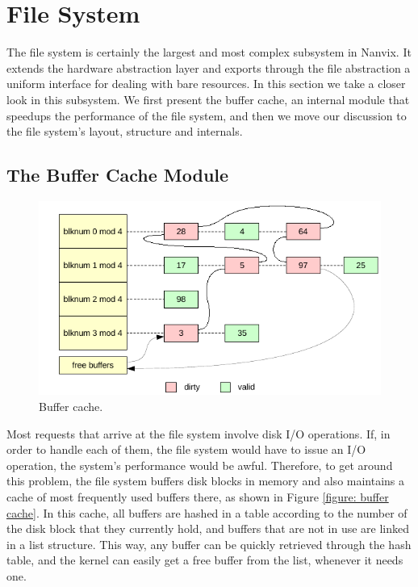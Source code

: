 \section{File System}
\label{section: file system}

	The file system is certainly the largest and most complex subsystem
	in Nanvix. It extends the hardware abstraction layer and exports
	through the file abstraction a uniform interface for dealing with
	bare resources. In this section we take a closer look in this
	subsystem. We first present the buffer cache, an internal module
	that speedups the performance of the file system, and then we move
	our discussion to the file system's layout, structure and internals.

	\subsection{The Buffer Cache Module}
	\label{subsection: the buffer cache module}

	\begin{figure}[t]
		\centering
		\includegraphics[scale=1]{img/buffer-cache}
		\caption{Buffer cache.}
		\label{figure: buffer cache}
	\end{figure}

	Most requests that arrive at the file system involve disk I/O
	operations. If, in order to handle each of them, the file system
	would have to issue an I/O operation, the system's performance would
	be awful. Therefore, to get around this problem, the file system
	buffers disk blocks in memory and also maintains a cache of most
	frequently used buffers there, as shown in Figure \ref{figure:
	buffer cache}. In this cache, all buffers are hashed in a table
	according to the number of the disk block that they currently hold,
	and buffers that are not in use are linked in a list structure. This
	way, any buffer can be quickly retrieved through the hash table, and
	the kernel can easily get a free buffer from the list, whenever it
	needs one.

